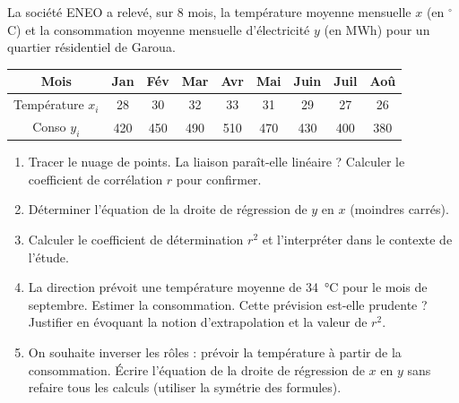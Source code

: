 \documentclass[11pt]{article}
\begin{document}
\begin{exercice}
La société ENEO a relevé, sur 8 mois, la température moyenne mensuelle $x$ (en $^\circ$C) et la consommation moyenne mensuelle d'électricité $y$ (en MWh) pour un quartier résidentiel de Garoua.

\begin{center}
\begin{tabular}{|c|c|c|c|c|c|c|c|c|}
\hline
Mois & Jan & Fév & Mar & Avr & Mai & Juin & Juil & Aoû \\
\hline
Température $x_i$ & 28 & 30 & 32 & 33 & 31 & 29 & 27 & 26 \\
\hline
Conso $y_i$ & 420 & 450 & 490 & 510 & 470 & 430 & 400 & 380 \\
\hline
\end{tabular}
\end{center}

\begin{enumerate}
    \item Tracer le nuage de points. La liaison paraît-elle linéaire ? Calculer le coefficient de corrélation $r$ pour confirmer.
    \item Déterminer l'équation de la droite de régression de $y$ en $x$ (moindres carrés).
    \item Calculer le coefficient de détermination $r^2$ et l'interpréter dans le contexte de l'étude.
    \item La direction prévoit une température moyenne de \SI{34}{\celsius} pour le mois de septembre. Estimer la consommation. Cette prévision est-elle prudente ? Justifier en évoquant la notion d'extrapolation et la valeur de $r^2$.
    \item On souhaite inverser les rôles : prévoir la température à partir de la consommation. Écrire l'équation de la droite de régression de $x$ en $y$ sans refaire tous les calculs (utiliser la symétrie des formules).
\end{enumerate}
\end{exercice}
\end{document}
